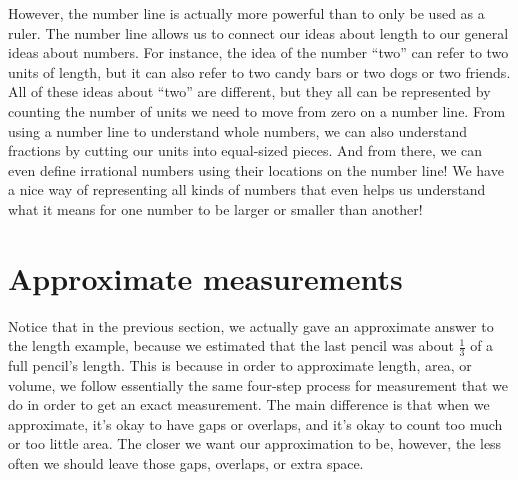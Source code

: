 \documentclass{ximera}
\begin{document}
However, the number line is actually more powerful than to only be used as a ruler. The number line allows us to connect our ideas about length to our general ideas about numbers. For instance, the idea of the number ``two'' can refer to two units of length, but it can also refer to two candy bars or two dogs or two friends. All of these ideas about ``two'' are different, but they all can be represented by counting the number of units we need to move from zero on a number line. From using a number line to understand whole numbers, we can also understand fractions by cutting our units into equal-sized pieces. And from there, we can even define irrational numbers using their locations on the number line! We have a nice way of representing all kinds of numbers that even helps us understand what it means for one number to be larger or smaller than another!



\section{Approximate measurements}

Notice that in the previous section, we actually gave an approximate answer to the length example, because we estimated that the last pencil was about $\frac13$ of a full pencil's length. This is because in order to approximate length, area, or volume, we follow essentially the same four-step process for measurement that we do in order to get an exact measurement. The main difference is that when we approximate, it's okay to have gaps or overlaps, and it's okay to count too much or too little area. The closer we want our approximation to be, however, the less often we should leave those gaps, overlaps, or extra space.
\end{document}
